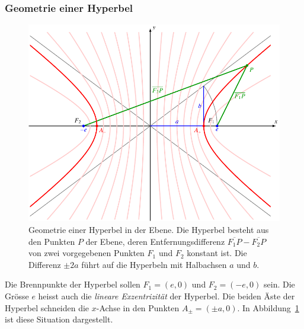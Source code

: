 \subsubsection{Geometrie einer Hyperbel}
\begin{figure}
\centering
\includegraphics{chapters/030-geometrie/images/hyperbel.pdf}
\caption{Geometrie einer Hyperbel in der Ebene.
Die Hyperbel besteht aus den Punkten $P$ der Ebene, deren Entfernungsdifferenz
$\overline{F_1P}-\overline{F_2P}$
von zwei vorgegebenen Punkten $F_1$ und $F_2$ konstant ist.
Die Differenz $\pm 2a$ führt auf die Hyperbeln mit Halbachsen
$a$ und $b$.
\label{buch:geometrie:hyperbel:fig:2d}}
\end{figure}
Die Brennpunkte der Hyperbel sollen $F_1=(e,0)$ und $F_2=(-e,0)$ sein.
Die Grösse $e$ heisst auch die {\em lineare Exzentrizität} der Hyperbel.
Die beiden Äste der Hyperbel schneiden die $x$-Achse in den Punkten
$A_\pm=(\pm a,0)$.
In Abbildung~\ref{buch:geometrie:hyperbel:fig:2d} ist diese Situation
dargestellt.


